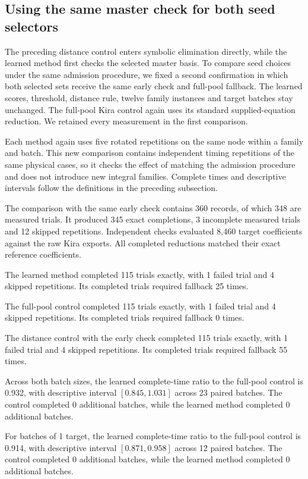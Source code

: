 \subsection{Using the same master check for both seed selectors}
The preceding distance control enters symbolic elimination directly,
while the learned method first checks the selected master basis.
To compare seed choices under the same admission procedure, we fixed
a second confirmation in which both selected sets receive the same
early check and full-pool fallback. The learned scores, threshold,
distance rule, twelve family instances and target batches stay
unchanged. The full-pool Kira control again uses its standard
supplied-equation reduction. We retained every measurement in the
first comparison.

Each method again uses five rotated repetitions on the same node
within a family and batch. This new comparison contains independent
timing repetitions of the same physical cases, so it checks the effect
of matching the admission procedure and does not introduce new
integral families. Complete times and descriptive intervals follow
the definitions in the preceding subsection.


The comparison with the same early check contains 360 records, of which 348 are measured trials. It produced 345 exact completions, 3 incomplete measured trials and 12 skipped repetitions. Independent checks evaluated 8,460 target coefficients against the raw Kira exports. All completed reductions matched their exact reference coefficients.

The learned method completed 115 trials exactly, with 1 failed trial and 4 skipped repetitions. Its completed trials required fallback 25 times.

The full-pool control completed 115 trials exactly, with 1 failed trial and 4 skipped repetitions. Its completed trials required fallback 0 times.

The distance control with the early check completed 115 trials exactly, with 1 failed trial and 4 skipped repetitions. Its completed trials required fallback 55 times.

Across both batch sizes, the learned complete-time ratio to the full-pool control is 0.932, with descriptive interval $[0.845,1.031]$ across 23 paired batches. The control completed 0 additional batches, while the learned method completed 0 additional batches.

For batches of 1 target, the learned complete-time ratio to the full-pool control is 0.914, with descriptive interval $[0.871,0.958]$ across 12 paired batches. The control completed 0 additional batches, while the learned method completed 0 additional batches.

